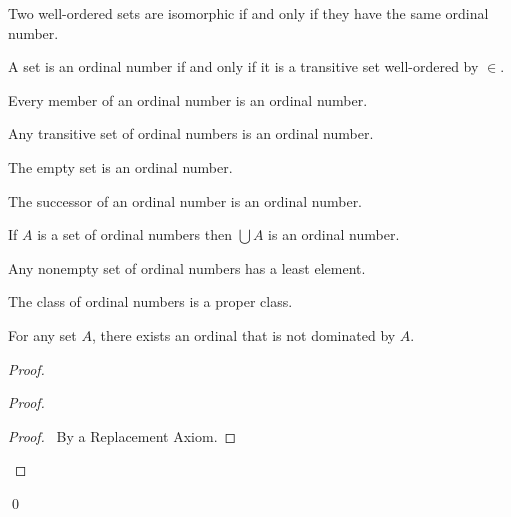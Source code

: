 \begin{theorem}
    Two well-ordered sets are isomorphic if and only if they have the same ordinal number.
\end{theorem}

\begin{theorem}
    A set is an ordinal number if and only if it is a transitive set well-ordered
    by $\in$.
\end{theorem}

\begin{theorem}
    Every member of an ordinal number is an ordinal number.
\end{theorem}

\begin{theorem}
    Any transitive set of ordinal numbers is an ordinal number.
\end{theorem}

\begin{theorem}
    The empty set is an ordinal number.
\end{theorem}

\begin{theorem}
    The successor of an ordinal number is an ordinal number.
\end{theorem}

\begin{theorem}
    If $A$ is a set of ordinal numbers then $\bigcup A$ is an ordinal number.
\end{theorem}

\begin{theorem}
    Any nonempty set of ordinal numbers has a least element.
\end{theorem}

\begin{theorem}
    The class of ordinal numbers is a proper class.
\end{theorem}

\begin{theorem}
    For any set $A$, there exists an ordinal that is not dominated by $A$.
\end{theorem}

\begin{proof}
    \pf
    \begin{proof}
        \qedstep
        \begin{proof}
            \pf\ By a Replacement Axiom.
        \end{proof}
    \end{proof}
    \qed
\end{proof}

